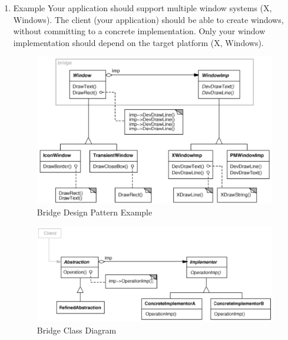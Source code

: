 \documentclass[11pt]{article}
\begin{document}
\begin{enumerate}
\item Example
\label{sec:org82e2658}
Your application should support multiple window systems (X, Windows).
The client (your application) should be able to create windows, without committing to a concrete implementation.
Only your window implementation should depend on the target platform (X, Windows).

\begin{figure}[htbp]
\centering
\includegraphics[width=.9\linewidth]{img/bridge_example.png}
\caption{\label{fig:bridge-design-pattern-example}Bridge Design Pattern Example}
\end{figure}

\begin{figure}[htbp]
\centering
\includegraphics[width=.9\linewidth]{img/bridge.png}
\caption{\label{fig:bridge-class-diagram}Bridge Class Diagram}
\end{figure}
\end{enumerate}
\end{document}
